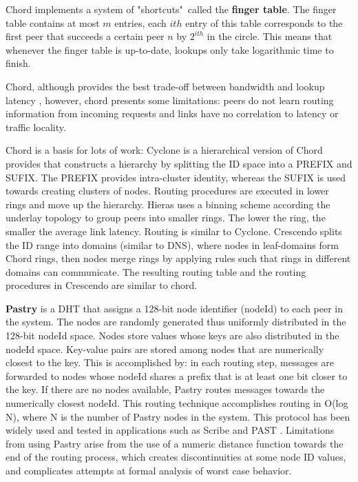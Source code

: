 Chord implements a system of "shortcuts"\ called the \textbf{finger table}. The finger table contains at most \(m\) entries, each $ith$ entry of this table corresponds to the first peer that succeeds a certain peer \(n\) by \(2^{ith}\) in the circle. This means that whenever the finger table is up-to-date, lookups only take logarithmic time to finish. 

Chord, although provides the best trade-off between bandwidth and lookup latency \cite{dht_performance_churn}, however, chord presents some limitations: peers do not learn routing information from incoming requests and links have no correlation to latency or traffic locality.

Chord is a basis for lots of work: Cyclone \cite{Artigas2005} is a hierarchical version of Chord provides that constructs a hierarchy by splitting the ID space into a PREFIX and SUFIX. The PREFIX provides intra-cluster identity, whereas the SUFIX is used towards creating clusters of nodes. Routing procedures are executed in lower rings and move up the hierarchy.  Hieras \cite{1240580} uses a binning scheme according the underlay topology to group peers into smaller rings. The lower the ring, the smaller the average link latency. Routing is similar to Cyclone. Crescendo \cite{Ganesan2004} splits the ID range into domains (similar to DNS), where nodes in leaf-domains form Chord rings, then nodes merge rings by applying rules such that rings in different domains can communicate. The resulting routing table and the routing procedures in Crescendo are similar to chord.

    
\textbf{Pastry} \cite{rowstron2001pastry} is a DHT that assigns a 128-bit node identifier (nodeId) to each peer in the system. The nodes are randomly generated thus uniformly distributed in the 128-bit nodeId space. Nodes store values whose keys are also distributed in the nodeId space. Key-value pairs are stored among nodes that are numerically closest to the key. This is accomplished by: in each routing step, messages are forwarded to nodes whose nodeId shares a prefix that is at least one bit closer to the key. If there are no nodes available, Pastry routes messages towards the numerically closest nodeId. This routing technique accomplishes routing in O(log N), where N is the number of Pastry nodes in the system. This protocol has been widely used and tested in applications such as Scribe \cite{10.1007/3-540-45546-9_3} and PAST \cite{990064}. Limitations from using Pastry arise from the use of a numeric distance function towards the end of the routing process, which creates discontinuities at some node ID values, and complicates attempts at formal analysis of worst case behavior.

